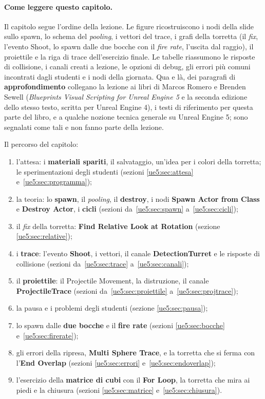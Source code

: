 \paragraph{Come leggere questo capitolo.} Il capitolo segue l'ordine della lezione. Le
figure ricostruiscono i nodi della slide sullo spawn, lo schema del \emph{pooling}, i
vettori del trace, i grafi della torretta (il \emph{fix}, l'evento Shoot, lo spawn dalle
due bocche con il \emph{fire rate}, l'uscita dal raggio), il proiettile e la riga di
trace dell'esercizio finale. Le tabelle riassumono le risposte di collisione, i canali
creati a lezione, le opzioni di debug, gli errori più comuni incontrati dagli studenti e
i nodi della giornata. Qua e là, dei paragrafi di \textbf{approfondimento} collegano la
lezione ai libri di Marcos Romero e Brenden Sewell (\emph{Blueprints Visual Scripting
for Unreal Engine 5} e la seconda edizione dello stesso testo, scritta per Unreal
Engine 4), i testi di riferimento per questa parte del libro, e a qualche nozione
tecnica generale su Unreal Engine 5; sono segnalati come tali e non fanno parte della
lezione.

Il percorso del capitolo:
\begin{enumerate}
  \item l'attesa: i \textbf{materiali spariti}, il salvataggio, un'idea per i colori
        della torretta; le sperimentazioni degli studenti (sezioni
        \ref{ue5:sec:attesa} e~\ref{ue5:sec:programma});
  \item la teoria: lo \textbf{spawn}, il \emph{pooling}, il \textbf{destroy}, i nodi
        \textbf{Spawn Actor from Class} e \textbf{Destroy Actor}, i \textbf{cicli}
        (sezioni da~\ref{ue5:sec:spawn} a~\ref{ue5:sec:cicli});
  \item il \emph{fix} della torretta: \textbf{Find Relative Look at Rotation} (sezione
        \ref{ue5:sec:relative});
  \item i \textbf{trace}: l'evento \textbf{Shoot}, i vettori, il canale
        \textbf{DetectionTurret} e le risposte di collisione (sezioni
        da~\ref{ue5:sec:trace} a~\ref{ue5:sec:canali});
  \item il \textbf{proiettile}: il Projectile Movement, la distruzione, il canale
        \textbf{ProjectileTrace} (sezioni da~\ref{ue5:sec:proiettile}
        a~\ref{ue5:sec:projtrace});
  \item la pausa e i problemi degli studenti (sezione \ref{ue5:sec:pausa});
  \item lo spawn dalle \textbf{due bocche} e il \textbf{fire rate} (sezioni
        \ref{ue5:sec:bocche} e~\ref{ue5:sec:firerate});
  \item gli errori della ripresa, \textbf{Multi Sphere Trace}, e la torretta che si
        ferma con l'\textbf{End Overlap} (sezioni \ref{ue5:sec:errori}
        e~\ref{ue5:sec:endoverlap});
  \item l'esercizio della \textbf{matrice di cubi} con il \textbf{For Loop}, la
        torretta che mira ai piedi e la chiusura (sezioni \ref{ue5:sec:matrice}
        e~\ref{ue5:sec:chiusura}).
\end{enumerate}

